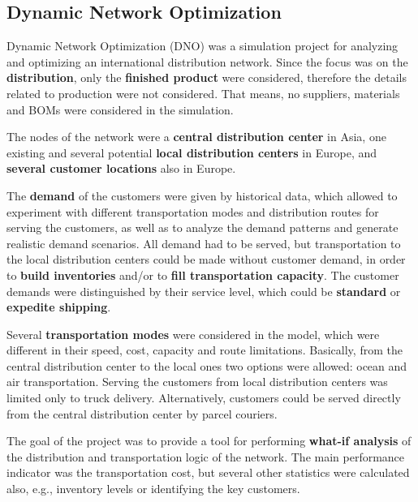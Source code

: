 \documentclass{article}
\begin{document}
\subsection{Dynamic Network Optimization}

Dynamic Network Optimization (DNO) was a simulation project for analyzing and optimizing an international distribution network. Since the focus was on the \textbf{distribution}, only the \textbf{finished product} were considered, therefore the details related to production were not considered. That means, no suppliers, materials and BOMs were considered in the simulation.

The nodes of the network were a \textbf{central distribution center} in Asia, one existing and several potential \textbf{local distribution centers} in Europe, and \textbf{several customer locations} also in Europe.

The \textbf{demand} of the customers were given by historical data, which allowed to experiment with different transportation modes and distribution routes for serving the customers, as well as to analyze the demand patterns and generate realistic demand scenarios. All demand had to be served, but transportation to the local distribution centers could be made without customer demand, in order to \textbf{build inventories} and/or to \textbf{fill transportation capacity}. The customer demands were distinguished by their service level, which could be \textbf{standard} or \textbf{expedite shipping}.

Several \textbf{transportation modes} were considered in the model, which were different in their speed, cost, capacity and route limitations. Basically, from the central distribution center to the local ones two options were allowed: ocean and air transportation. Serving the customers from local distribution centers was limited only to truck delivery. Alternatively, customers could be served directly from the central distribution center by parcel couriers.

The goal of the project was to provide a tool for performing \textbf{what-if analysis} of the distribution and transportation logic of the network. The main performance indicator was the transportation cost, but several other statistics were calculated also, e.g., inventory levels or identifying the key customers.
\end{document}
